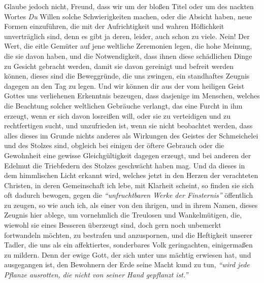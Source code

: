 Glaube jedoch nicht, Freund, dass wir um der bloßen Titel oder um des nackten
Wortes \textit{Du} Willen solche Schwierigkeiten machen, oder die Absicht haben,
neue
Formen einzuführen, die mit der Aufrichtigkeit und wahren Höflichkeit
unverträglich sind, denn es gibt ja deren, leider, auch schon zu viele. Nein!
Der Wert, die eitle Gemüter auf jene weltliche Zeremonien legen, die hohe
Meinung, die sie davon haben, und die Notwendigkeit, dass ihnen diese
schädlichen Dinge zu Gesicht gebracht werden, damit sie davon gereinigt und
befreit werden können, dieses sind die Beweggründe, die uns zwingen, ein
standhaftes Zeugnis dagegen an den Tag zu legen. Und wir können
dir aus der vom
heiligen Geist Gottes uns verliehenen Erkenntnis bezeugen, dass dasjenige im
Menschen, welches die Beachtung solcher weltlichen
Gebräuche verlangt, das
eine Furcht in ihm erzeugt, wenn er sich davon losreißen will, oder sie zu
verteidigen und zu rechtfertigen sucht, und unzufrieden ist, wenn sie nicht
beobachtet werden, dass alles dieses im Grunde nichts anderes als Wirkungen des
Geistes der Schmeichelei und des Stolzes sind, obgleich bei einigen der öftere
Gebrauch oder die Gewohnheit eine gewisse Gleichgültigkeit dagegen erzeugt, und
bei anderen der Edelmut die Triebfedern des Stolzes geschwächt haben mag. Und
da dieses in dem himmlischen Licht erkannt wird, welches jetzt in den Herzen
der verachteten Christen, in deren Gemeinschaft ich lebe, mit Klarheit scheint,
so finden sie sich oft dadurch bewogen, gegen die \textit{"`unfruchtbaren Werke
der
Finsternis"'} öffentlich zu zeugen, so wie auch ich, als einer
von den ihrigen,
und in ihrem Namen, dieses Zeugnis hier ablege, um vornehmlich die Treulosen und
Wankelmütigen, die, wiewohl sie eines Besseren überzeugt sind, doch gern noch
unbemerkt fortwandeln möchten, zu bestrafen und anzuspornen, und die Heftigkeit
unserer Tadler, die uns als ein affektiertes, sonderbares Volk geringachten,
einigermaßen zu mildern. Denn der ewige Gott, der sich unter uns mächtig
erwiesen hat, und ausgegangen ist, den Bewohnern der Erde seine Macht kund zu
tun,
\textit{"`wird jede Pflanze ausrotten, die nicht von seiner Hand gepflanzt
ist."'}

\medskip


